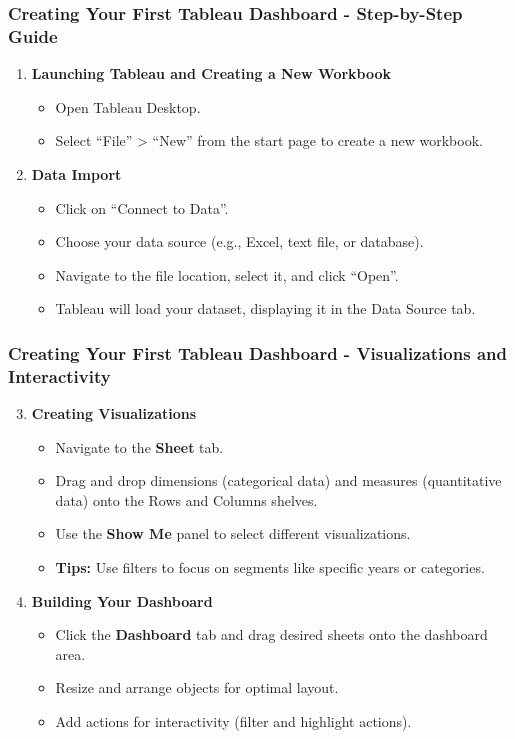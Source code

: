 \documentclass[aspectratio=169]{beamer}
\begin{document}
\begin{frame}[fragile]
    \frametitle{Creating Your First Tableau Dashboard - Step-by-Step Guide}
    \begin{enumerate}
        \item \textbf{Launching Tableau and Creating a New Workbook}
        \begin{itemize}
            \item Open Tableau Desktop.
            \item Select ``File'' > ``New'' from the start page to create a new workbook.
        \end{itemize}

        \item \textbf{Data Import}
        \begin{itemize}
            \item Click on ``Connect to Data''.
            \item Choose your data source (e.g., Excel, text file, or database).
            \item Navigate to the file location, select it, and click ``Open''.
            \item Tableau will load your dataset, displaying it in the Data Source tab.
        \end{itemize}
    \end{enumerate}
\end{frame}

\begin{frame}[fragile]
    \frametitle{Creating Your First Tableau Dashboard - Visualizations and Interactivity}
    \begin{enumerate}
        \setcounter{enumi}{2}
        \item \textbf{Creating Visualizations}
        \begin{itemize}
            \item Navigate to the \textbf{Sheet} tab.
            \item Drag and drop dimensions (categorical data) and measures (quantitative data) onto the Rows and Columns shelves.
            \item Use the \textbf{Show Me} panel to select different visualizations.
            \item \textbf{Tips:} Use filters to focus on segments like specific years or categories.
        \end{itemize}

        \item \textbf{Building Your Dashboard}
        \begin{itemize}
            \item Click the \textbf{Dashboard} tab and drag desired sheets onto the dashboard area.
            \item Resize and arrange objects for optimal layout.
            \item Add actions for interactivity (filter and highlight actions).
        \end{itemize}
    \end{enumerate}
\end{frame}
\end{document}
